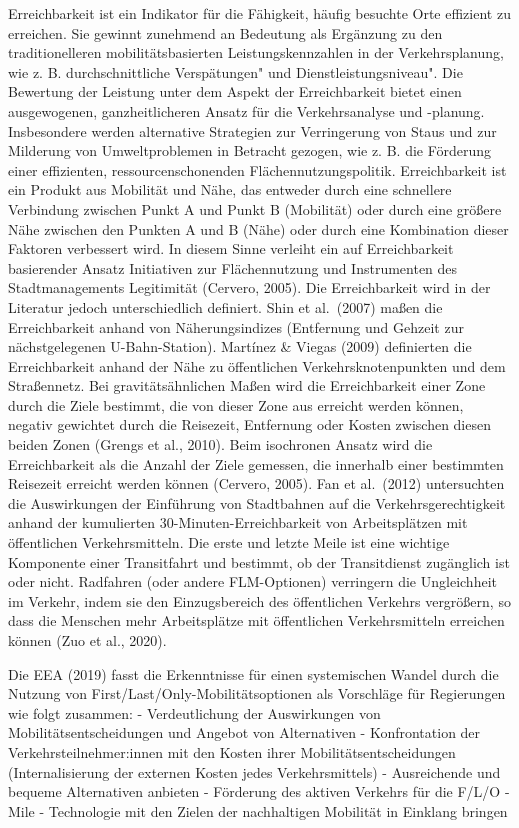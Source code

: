 \documentclass[
]{book}
\begin{document}
Erreichbarkeit ist ein Indikator für die Fähigkeit, häufig besuchte Orte effizient zu erreichen. Sie gewinnt zunehmend an Bedeutung als Ergänzung zu den traditionelleren mobilitätsbasierten Leistungskennzahlen in der Verkehrsplanung, wie z. B. durchschnittliche Verspätungen" und Dienstleistungsniveau". Die Bewertung der Leistung unter dem Aspekt der Erreichbarkeit bietet einen ausgewogenen, ganzheitlicheren Ansatz für die Verkehrsanalyse und -planung. Insbesondere werden alternative Strategien zur Verringerung von Staus und zur Milderung von Umweltproblemen in Betracht gezogen, wie z. B. die Förderung einer effizienten, ressourcenschonenden Flächennutzungspolitik. Erreichbarkeit ist ein Produkt aus Mobilität und Nähe, das entweder durch eine schnellere Verbindung zwischen Punkt A und Punkt B (Mobilität) oder durch eine größere Nähe zwischen den Punkten A und B (Nähe) oder durch eine Kombination dieser Faktoren verbessert wird. In diesem Sinne verleiht ein auf Erreichbarkeit basierender Ansatz Initiativen zur Flächennutzung und Instrumenten des Stadtmanagements Legitimität (Cervero, 2005).
Die Erreichbarkeit wird in der Literatur jedoch unterschiedlich definiert. Shin et al.~(2007) maßen die Erreichbarkeit anhand von Näherungsindizes (Entfernung und Gehzeit zur nächstgelegenen U-Bahn-Station). Martínez \& Viegas (2009) definierten die Erreichbarkeit anhand der Nähe zu öffentlichen Verkehrsknotenpunkten und dem Straßennetz. Bei gravitätsähnlichen Maßen wird die Erreichbarkeit einer Zone durch die Ziele bestimmt, die von dieser Zone aus erreicht werden können, negativ gewichtet durch die Reisezeit, Entfernung oder Kosten zwischen diesen beiden Zonen (Grengs et al., 2010). Beim isochronen Ansatz wird die Erreichbarkeit als die Anzahl der Ziele gemessen, die innerhalb einer bestimmten Reisezeit erreicht werden können (Cervero, 2005). Fan et al.~(2012) untersuchten die Auswirkungen der Einführung von Stadtbahnen auf die Verkehrsgerechtigkeit anhand der kumulierten 30-Minuten-Erreichbarkeit von Arbeitsplätzen mit öffentlichen Verkehrsmitteln. Die erste und letzte Meile ist eine wichtige Komponente einer Transitfahrt und bestimmt, ob der Transitdienst zugänglich ist oder nicht. Radfahren (oder andere FLM-Optionen) verringern die Ungleichheit im Verkehr, indem sie den Einzugsbereich des öffentlichen Verkehrs vergrößern, so dass die Menschen mehr Arbeitsplätze mit öffentlichen Verkehrsmitteln erreichen können (Zuo et al., 2020).

Die EEA (2019) fasst die Erkenntnisse für einen systemischen Wandel durch die Nutzung von First/Last/Only-Mobilitätsoptionen als Vorschläge für Regierungen wie folgt zusammen:
- Verdeutlichung der Auswirkungen von Mobilitätsentscheidungen und Angebot von Alternativen
- Konfrontation der Verkehrsteilnehmer:innen mit den Kosten ihrer Mobilitätsentscheidungen (Internalisierung der externen Kosten jedes Verkehrsmittels)
- Ausreichende und bequeme Alternativen anbieten
- Förderung des aktiven Verkehrs für die F/L/O - Mile
- Technologie mit den Zielen der nachhaltigen Mobilität in Einklang bringen
\end{document}
